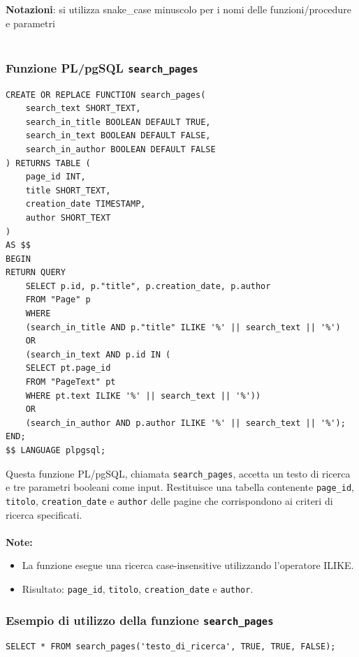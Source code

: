 \documentclass{article}
\begin{document}
\textbf{Notazioni}: si utilizza snake\_case minuscolo per i nomi delle funzioni/procedure e parametri
\\\\

\subsubsection{Funzione PL/pgSQL \texttt{search\_pages}}
	
\begin{lstlisting}[style=SQL, caption={Funzione SQL per la ricerca di pagine}]
CREATE OR REPLACE FUNCTION search_pages(
	search_text SHORT_TEXT,
	search_in_title BOOLEAN DEFAULT TRUE,
	search_in_text BOOLEAN DEFAULT FALSE,
	search_in_author BOOLEAN DEFAULT FALSE
) RETURNS TABLE (
	page_id INT,
	title SHORT_TEXT,
	creation_date TIMESTAMP,
	author SHORT_TEXT
) 
AS $$
BEGIN
RETURN QUERY
	SELECT p.id, p."title", p.creation_date, p.author
	FROM "Page" p
	WHERE
	(search_in_title AND p."title" ILIKE '%' || search_text || '%') 
	OR
	(search_in_text AND p.id IN (
	SELECT pt.page_id 
	FROM "PageText" pt
	WHERE pt.text ILIKE '%' || search_text || '%')) 
	OR
	(search_in_author AND p.author ILIKE '%' || search_text || '%');
END;
$$ LANGUAGE plpgsql;
\end{lstlisting}
Questa funzione PL/pgSQL, chiamata \texttt{search\_pages}, accetta un testo di ricerca e tre parametri booleani come input. Restituisce una tabella contenente \texttt{page\_id}, \texttt{titolo}, \texttt{creation\_date} e \texttt{author} delle pagine che corrispondono ai criteri di ricerca specificati. 
\\\\
\textbf{Note:} 

\begin{itemize}
	\item La funzione esegue una ricerca case-insensitive utilizzando l'operatore ILIKE.
	\item Risultato: \texttt{page\_id}, \texttt{titolo}, \texttt{creation\_date} e \texttt{author}.
\end{itemize}

\subsubsection{Esempio di utilizzo della funzione \texttt{search\_pages}}

\begin{lstlisting}[style=SQL]
SELECT * FROM search_pages('testo_di_ricerca', TRUE, TRUE, FALSE);
\end{lstlisting}
	
\end{document}
